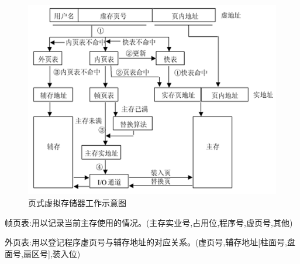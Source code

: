 \documentclass[UTF8,a4paper]{ctexart}%
\begin{document}
              \begin{figure}[!htp]
                \centering
                \includegraphics[scale=0.3]{assets/jisuanjizucheng2_94b04.png}
                \caption{页式虚拟存储器工作示意图}
                \label{fig4}
              \end{figure}

              帧页表:用以记录当前主存使用的情况。(主存实业号,占用位,程序号,虚页号,其他)

              外页表:用以登记程序虚页号与辅存地址的对应关系。(虚页号,辅存地址[柱面号,盘面号,扇区号],装入位)
\end{document}

